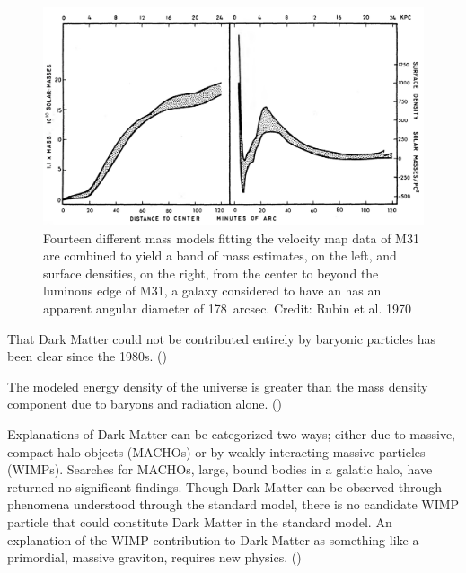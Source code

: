\documentclass{paper}
\begin{document}
  \begin{figure}[!htb]
    \begin{centering}
    \includegraphics[scale=0.4]{DM-masscurve.pdf}
    \caption{Fourteen different mass models fitting the velocity map data of
      M31 are combined to yield a band of mass estimates, on the left, and 
      surface densities, on the right, from the center to beyond the luminous 
      edge of M31, a galaxy considered to have an has an apparent angular 
      diameter of \SI{178}{arcsec}.
    Credit: Rubin et al. 1970}
    \label{fig:DM-masscurve}
    \end{centering}
  \end{figure}

  That Dark Matter could not be contributed entirely by baryonic particles
  has been clear since the 1980s. (\cite{liddle2015introduction})

  The modeled energy density of the universe is greater than the mass density
  component due to baryons and radiation alone. 
  (\cite{Clowe_2006})

  Explanations of Dark Matter can be categorized two ways; either due to 
  massive, compact halo objects (MACHOs) or by weakly interacting massive 
  particles (WIMPs). Searches for MACHOs, large, bound bodies in a galatic 
  halo, have returned no significant findings. Though Dark Matter can be 
  observed through phenomena understood through the standard model, there is 
  no candidate WIMP particle that could constitute Dark Matter in the standard 
  model. An explanation of the WIMP contribution to Dark Matter as something 
  like a primordial, massive graviton, requires new physics.
  (\cite{PhysRevLett.128.081806})

\end{document}
